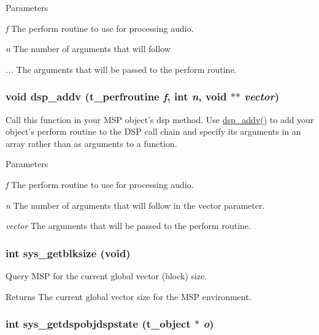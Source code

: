 \begin{DoxyParams}{Parameters}
\item[{\em f}]The perform routine to use for processing audio. \item[{\em n}]The number of arguments that will follow \item[{\em ...}]The arguments that will be passed to the perform routine. \end{DoxyParams}
\hypertarget{group__msp_gaf8709cab1b4bbbbd78010f765e83b328}{
\subsubsection[{dsp\_\-addv}]{\setlength{\rightskip}{0pt plus 5cm}void dsp\_\-addv ({\bf t\_\-perfroutine} {\em f}, \/  int {\em n}, \/  void $\ast$$\ast$ {\em vector})}}
\label{group__msp_gaf8709cab1b4bbbbd78010f765e83b328}


Call this function in your MSP object's dsp method. Use \hyperlink{group__msp_gaf8709cab1b4bbbbd78010f765e83b328}{dsp\_\-addv()} to add your object's perform routine to the DSP call chain and specify its arguments in an array rather than as arguments to a function.


\begin{DoxyParams}{Parameters}
\item[{\em f}]The perform routine to use for processing audio. \item[{\em n}]The number of arguments that will follow in the vector parameter. \item[{\em vector}]The arguments that will be passed to the perform routine. \end{DoxyParams}
\hypertarget{group__msp_ga1d6745373b742617d281901bb063175d}{
\subsubsection[{sys\_\-getblksize}]{\setlength{\rightskip}{0pt plus 5cm}int sys\_\-getblksize (void)}}
\label{group__msp_ga1d6745373b742617d281901bb063175d}


Query MSP for the current global vector (block) size. \begin{DoxyReturn}{Returns}
The current global vector size for the MSP environment. 
\end{DoxyReturn}
\hypertarget{group__msp_gac949528775cd2346a95c4f89b91567d6}{
\subsubsection[{sys\_\-getdspobjdspstate}]{\setlength{\rightskip}{0pt plus 5cm}int sys\_\-getdspobjdspstate ({\bf t\_\-object} $\ast$ {\em o})}}
\label{group__msp_gac949528775cd2346a95c4f89b91567d6}


